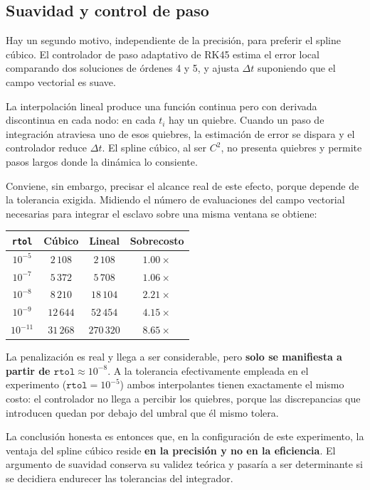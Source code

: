 \documentclass[12pt,a4paper]{article}
\begin{document}
\subsection{Suavidad y control de paso}

Hay un segundo motivo, independiente de la precisión, para preferir el spline cúbico. El controlador de paso adaptativo de RK45 estima el error local comparando dos soluciones de órdenes 4 y 5, y ajusta $\Delta t$ suponiendo que el campo vectorial es suave.

La interpolación lineal produce una función continua pero con derivada discontinua en cada nodo: en cada $t_i$ hay un quiebre. Cuando un paso de integración atraviesa uno de esos quiebres, la estimación de error se dispara y el controlador reduce $\Delta t$. El spline cúbico, al ser $C^2$, no presenta quiebres y permite pasos largos donde la dinámica lo consiente.

Conviene, sin embargo, precisar el alcance real de este efecto, porque depende de la tolerancia exigida. Midiendo el número de evaluaciones del campo vectorial necesarias para integrar el esclavo sobre una misma ventana se obtiene:

\begin{center}
\begin{tabularx}{0.9\textwidth}{@{}c c c c@{}}
\toprule
\texttt{rtol} & \textbf{Cúbico} & \textbf{Lineal} & \textbf{Sobrecosto} \\
\midrule
$10^{-5}$  & $2\,108$  & $2\,108$   & $1.00\times$ \\
$10^{-7}$  & $5\,372$  & $5\,708$   & $1.06\times$ \\
$10^{-8}$  & $8\,210$  & $18\,104$  & $2.21\times$ \\
$10^{-9}$  & $12\,644$ & $52\,454$  & $4.15\times$ \\
$10^{-11}$ & $31\,268$ & $270\,320$ & $8.65\times$ \\
\bottomrule
\end{tabularx}
\end{center}

La penalización es real y llega a ser considerable, pero \textbf{solo se manifiesta a partir de $\texttt{rtol} \approx 10^{-8}$}. A la tolerancia efectivamente empleada en el experimento ($\texttt{rtol} = 10^{-5}$) ambos interpolantes tienen exactamente el mismo costo: el controlador no llega a percibir los quiebres, porque las discrepancias que introducen quedan por debajo del umbral que él mismo tolera.

La conclusión honesta es entonces que, en la configuración de este experimento, la ventaja del spline cúbico reside \textbf{en la precisión y no en la eficiencia}. El argumento de suavidad conserva su validez teórica y pasaría a ser determinante si se decidiera endurecer las tolerancias del integrador.
\end{document}
